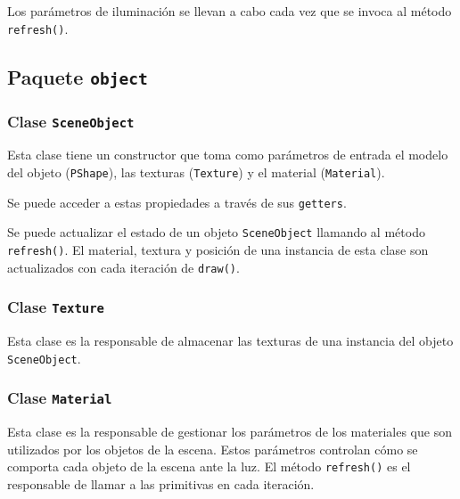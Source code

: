 \documentclass[10pt,a4paper]{report}
\begin{document}
	Los parámetros de iluminación se llevan a cabo cada vez que se invoca al método \texttt{refresh()}.
	
	
	
	\subsection{Paquete \texttt{object}}
	\subsubsection{Clase \texttt{SceneObject}}
	Esta clase tiene un constructor que toma como parámetros de entrada el modelo del objeto (\texttt{PShape}), las texturas (\texttt{Texture}) y el material (\texttt{Material}).
	
	
	
	Se puede acceder a estas propiedades a través de sus \texttt{getters}.
	
	
	
	Se puede actualizar el estado de un objeto \texttt{SceneObject} llamando al método \texttt{refresh()}. El material, textura y posición de una instancia de esta clase son actualizados con cada iteración de \texttt{draw()}.
	
	
	
	\subsubsection{Clase \texttt{Texture}}
	Esta clase es la responsable de almacenar las texturas de una instancia del objeto \texttt{SceneObject}.
	
	
	
	\subsubsection{Clase \texttt{Material}}
	Esta clase es la responsable de gestionar los parámetros de los materiales que son utilizados por los objetos de la escena. Estos parámetros controlan cómo se comporta cada objeto de la escena ante la luz. El método \texttt{refresh()} es el responsable de llamar a las primitivas en cada iteración.
	
\end{document}
